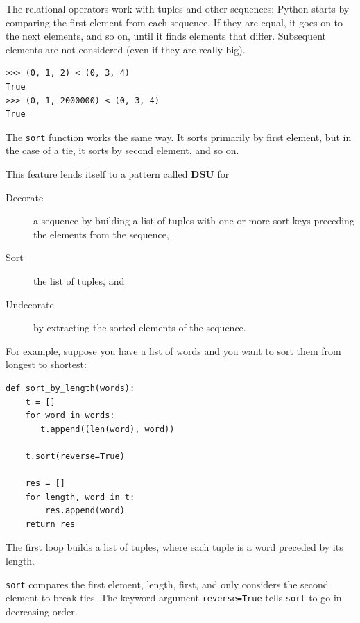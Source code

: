 \documentclass[10pt]{book}
\begin{document}
The relational operators work with tuples and other sequences;
Python starts by comparing the first element from each
sequence.  If they are equal, it goes on to the next elements,
and so on, until it finds elements that differ.  Subsequent
elements are not considered (even if they are really big).

\begin{verbatim}
>>> (0, 1, 2) < (0, 3, 4)
True
>>> (0, 1, 2000000) < (0, 3, 4)
True
\end{verbatim}
%
The {\tt sort} function works the same way.  It sorts
primarily by first element, but in the case of a tie, it sorts
by second element, and so on.

This feature lends itself to a pattern called {\bf DSU} for

\begin{description}

\item[Decorate] a sequence by building a list of tuples
with one or more sort keys preceding the elements from the sequence,

\item[Sort] the list of tuples, and

\item[Undecorate] by extracting the sorted elements of the sequence.

\end{description}

\label{DSU}

For example, suppose you have a list of words and you want to
sort them from longest to shortest:

\begin{verbatim}
def sort_by_length(words):
    t = []
    for word in words:
       t.append((len(word), word))

    t.sort(reverse=True)

    res = []
    for length, word in t:
        res.append(word)
    return res
\end{verbatim}
%
The first loop builds a list of tuples, where each
tuple is a word preceded by its length.

{\tt sort} compares the first element, length, first, and
only considers the second element to break ties.  The keyword argument
{\tt reverse=True} tells {\tt sort} to go in decreasing order.
\end{document}
